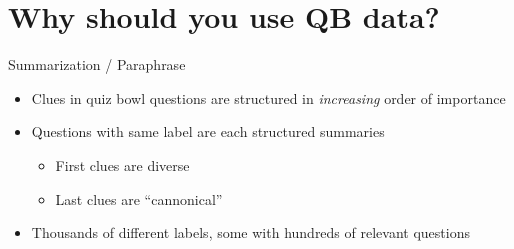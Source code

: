 
\section{Why should you use QB data?}

\begin{frame}{Summarization / Paraphrase}

\begin{itemize}
  \item Clues in quiz bowl questions are structured in \emph{increasing} order of importance
  \item Questions with same label are each structured summaries
    \begin{itemize}
      \item First clues are diverse
      \item Last clues are ``cannonical''
      \end{itemize}
  \item Thousands of different labels, some with hundreds of relevant questions
\end{itemize}

\end{frame}

